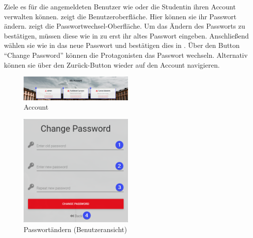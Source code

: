 Ziele es für die angemeldeten Benutzer wie \duzi oder die Studentin \ariane ihren Account verwalten können. 
\abb {} zeigt die Benutzeroberfläche. \newline
Hier können sie ihr Passwort ändern. 
\abb {} zeigt die Passwortwechsel-Oberfläche. 
Um das Ändern des Passworts zu bestätigen, müssen diese wie in \desOne zu erst ihr altes Passwort eingeben. 
Anschließend wählen sie wie in \desTwo das neue Passwort und bestätigen dies in \desThree. 
Über den Button \enquote{Change Password} können die Protagonisten das Passwort wechseln. 
Alternativ können sie über den Zurück-Button \desFour wieder auf den Account navigieren. 
% 
\begin{figure}[H]
	\centering
	\includegraphics[width=0.5\textwidth, keepaspectratio]{img/guide/MyAccount.png}
	\captionsetup{justification=centering, format=plain}
	\caption[Account]{Account\\\quelleScreenshot}
	\label{fig:MyAccount}
\end{figure}
% 
\begin{figure}[H]
	\centering
	\includegraphics[width=0.5\textwidth, keepaspectratio]{img/guide/ChangeOwnPassword.png}
	\captionsetup{justification=centering, format=plain}
	\caption[Passwortändern (Benutzeransicht)]{Passwortändern (Benutzeransicht)\\\quelleScreenshot}
	\label{fig:ChangeOwnPassword}
\end{figure}
% 
